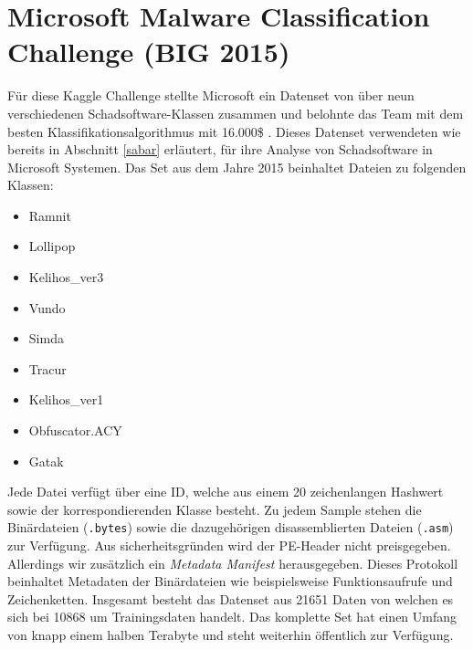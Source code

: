 \documentclass[
    12pt, %
    DIV10,
    ngerman, %
    a4paper, %
    oneside, %
    titlepage, %
    parskip=half, %
    headings=normal, %
    listof=totoc, %
    bibliography=totoc, %
    index=totoc, %
    captions=tableheading, %
    final %
]{scrreprt}
\begin{document}
\section{Microsoft Malware Classification Challenge (BIG 2015)}
Für diese Kaggle Challenge stellte Microsoft ein Datenset von über neun verschiedenen Schadsoftware-Klassen zusammen und belohnte das Team mit dem besten Klassifikationsalgorithmus mit 16.000\$ \parencite{Kaggle}. Dieses Datenset verwendeten wie bereits in Abschnitt \ref{sabar} erläutert, \textcite{Sabar2018} für ihre Analyse von Schadsoftware in Microsoft Systemen.
Das Set aus dem Jahre 2015 beinhaltet Dateien zu folgenden Klassen:
\begin{itemize}
\item Ramnit
\item Lollipop
\item Kelihos\_ver3
\item Vundo
\item Simda
\item Tracur
\item Kelihos\_ver1
\item Obfuscator.ACY
\item Gatak
\end{itemize}
Jede Datei verfügt über eine ID, welche aus einem 20 zeichenlangen Hashwert sowie der korrespondierenden Klasse besteht. Zu jedem Sample stehen die Binärdateien (\texttt{.bytes}) sowie die dazugehörigen disassemblierten Dateien (\texttt{.asm}) zur Verfügung. Aus sicherheitsgründen wird der PE-Header nicht preisgegeben. Allerdings wir zusätzlich ein \emph{Metadata Manifest} herausgegeben. Dieses Protokoll beinhaltet Metadaten der Binärdateien wie beispielsweise Funktionsaufrufe und Zeichenketten.
Insgesamt besteht das Datenset aus 21651 Daten von welchen es sich bei 10868 um Trainingsdaten handelt. Das komplette Set hat einen Umfang von knapp einem halben Terabyte und steht weiterhin öffentlich zur Verfügung.
\end{document}
